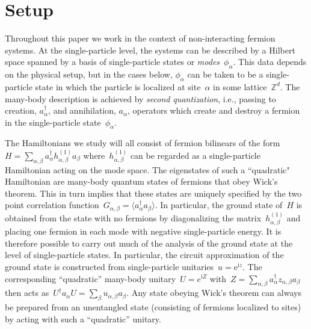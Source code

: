 \documentclass[aps,pra,reprint,superscriptaddress,floatfix,amsmath,amssymb,amsfonts]{revtex4-1}
\newcommand*{\Z}{\mathbb Z}
\begin{document}
\section{Setup}\label{sec:setup}
Throughout this paper we work in the context of non-interacting fermion systems.
At the single-particle level, the systems can be described by a Hilbert space spanned by a basis of single-particle states or \emph{modes}~$\phi_\alpha$.
This data depends on the physical setup, but in the cases below, $\phi_\alpha$ can be taken to be a single-particle state in which the particle is localized at site~$\alpha$ in some lattice~$\Z^d$.
The many-body description is achieved by \emph{second quantization}, i.e.,
passing to creation, $a_\alpha^\dagger$, and annihilation, $a_\alpha$, operators which create and destroy a fermion in the single-particle state~$\phi_\alpha$.

The Hamiltonians we study will all consist of fermion bilinears of the form~$H = \sum_{\alpha, \beta} a_\alpha^\dagger h^{(1)}_{\alpha,\beta} a_\beta$ where~$h^{(1)}_{\alpha,\beta}$ can be regarded as a single-particle Hamiltonian acting on the mode space.
The eigenstates of such a ``quadratic" Hamiltonian are many-body quantum states of fermions that obey Wick's theorem.
This in turn implies that these states are uniquely specified by the two point correlation function~$G_{\alpha,\beta} = \langle a_\alpha^\dagger a_\beta \rangle$.
In particular, the ground state of~$H$ is obtained from the state with no fermions by diagonalizing the matrix~$h^{(1)}_{\alpha,\beta}$ and placing one fermion in each mode with negative single-particle energy.
It is therefore possible to carry out much of the analysis of the ground state at the level of single-particle states.
In particular, the circuit approximation of the ground state is constructed from single-particle unitaries~$u = \mathrm{e}^{\mathrm{i} z}$.
The corresponding ``quadratic'' many-body unitary~$U = e^{\mathrm{i} Z}$ with~$Z = \sum_{\alpha,\beta} a_\alpha^\dagger z_{\alpha,\beta} a_\beta$ then acts as~$U^\dagger a_\alpha U = \sum_\beta u_{\alpha,\beta} a_\beta$.
Any state obeying Wick's theorem can always be prepared from an unentangled state (consisting of fermions localized to sites) by acting with such a ``quadratic'' unitary.
\end{document}
